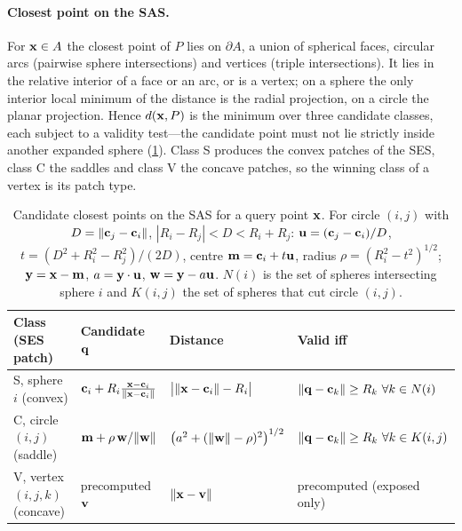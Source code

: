 \paragraph{Closest point on the SAS.}
For $\mathbf{x} \in A$ the closest point of $P$ lies on $\partial A$, a union of
spherical faces, circular arcs (pairwise sphere intersections) and vertices
(triple intersections). It lies in the relative interior of a face or an
arc, or is a vertex; on a sphere the only interior local minimum of the
distance is the radial projection, on a circle the planar projection. Hence
$d(\mathbf{x}, P)$ is the minimum over three candidate classes, each subject to
a validity test---the candidate point must not lie strictly inside another
expanded sphere (\cref{tab:classes}). Class S produces the convex patches
of the SES, class C the saddles and class V the concave patches, so the
winning class of a vertex is its patch type.

\begin{table}[t]
  \centering
  \caption{Candidate closest points on the SAS for a query point $\mathbf{x}$.
    For circle $(i,j)$ with $D = \lVert\mathbf{c}_j - \mathbf{c}_i\rVert$,
    $|R_i - R_j| < D < R_i + R_j$: $\mathbf{u} = (\mathbf{c}_j - \mathbf{c}_i)/D$,
    $t = (D^2 + R_i^2 - R_j^2)/(2D)$, centre $\mathbf{m} = \mathbf{c}_i + t\mathbf{u}$,
    radius $\rho = (R_i^2 - t^2)^{1/2}$; $\mathbf{y} = \mathbf{x} - \mathbf{m}$,
    $a = \mathbf{y} \cdot \mathbf{u}$, $\mathbf{w} = \mathbf{y} - a\mathbf{u}$. $N(i)$ is the
    set of spheres intersecting sphere $i$ and $K(i,j)$ the set of spheres
    that cut circle $(i,j)$.}
  \label{tab:classes}
  \small
  \begin{tabular}{@{}llll@{}}
    \toprule
    Class (SES patch) & Candidate $\mathbf{q}$ & Distance & Valid iff \\
    \midrule
    S, sphere $i$ (convex) &
      $\mathbf{c}_i + R_i \frac{\mathbf{x} - \mathbf{c}_i}{\lVert\mathbf{x} - \mathbf{c}_i\rVert}$ &
      $\bigl|\lVert\mathbf{x} - \mathbf{c}_i\rVert - R_i\bigr|$ &
      $\lVert\mathbf{q} - \mathbf{c}_k\rVert \ge R_k\ \forall k \in N(i)$ \\[4pt]
    C, circle $(i,j)$ (saddle) &
      $\mathbf{m} + \rho\, \mathbf{w}/\lVert\mathbf{w}\rVert$ &
      $\bigl(a^2 + (\lVert\mathbf{w}\rVert - \rho)^2\bigr)^{1/2}$ &
      $\lVert\mathbf{q} - \mathbf{c}_k\rVert \ge R_k\ \forall k \in K(i,j)$ \\[4pt]
    V, vertex $(i,j,k)$ (concave) &
      precomputed $\mathbf{v}$ & $\lVert\mathbf{x} - \mathbf{v}\rVert$ &
      precomputed (exposed only) \\
    \bottomrule
  \end{tabular}
\end{table}

